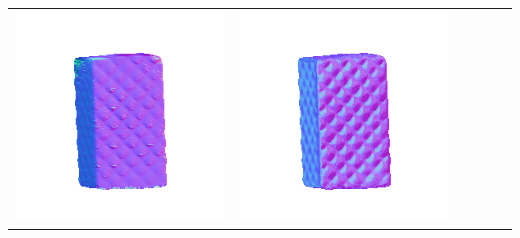 \begin{tabularx}{\linewidth}{@{}Y@{}Y@{}Y@{}Y@{}Y@{}Y@{}}
\includegraphics[width=\linewidth]{semisynthetic/20150514_18_yu_out.png} &
\includegraphics[width=\linewidth]{semisynthetic/20150514_18_dpsn_out.png} &

\end{tabularx}
